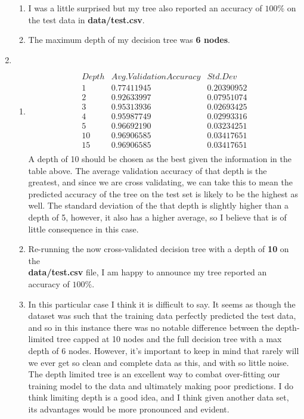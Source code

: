 \documentclass[11pt,a4paper,draft]{article}
\begin{document}
\begin{enumerate}
\begin{enumerate}
				 \item I was a little surprised but my tree also reported an accuracy of $100\%$ on the test data in \textbf{data/test.csv}.
				 
				 \item The maximum depth of my decision tree was \textbf{6 nodes}.
				
			\end{enumerate}
		
			\item $ $
			\begin{enumerate}
				\item $$
				\begin{array}{c|cc}
					Depth & Avg. Validation Accuracy & Std. Dev \\ \hline
					1  & 0.77411945  & 0.20390952   \\
					2  & 0.92633997  & 0.07951074   \\
					3  & 0.95313936  & 0.02693425   \\
					4  & 0.95987749  & 0.02993316   \\
					5  & 0.96692190  & 0.03234251   \\
					10 & 0.96906585  & 0.03417651   \\
					15 & 0.96906585  & 0.03417651   \\
				\end{array}
				$$ A depth of 10 should be chosen as the best given the information in the table above. The average validation accuracy of that depth is the greatest, and since we are cross validating, we can take this to mean the predicted accuracy of the tree on the test set is likely to be the highest as well. The standard deviation of the that depth is slightly higher than a depth of 5, however, it also has a higher average, so I believe that is of little consequence in this case.
				
				\item Re-running the now cross-validated decision tree with a depth of \textbf{10} on the \\\textbf{data/test.csv} file, I am happy to announce my tree reported an accuracy of $100\%$.
				
				\item In this particular case I think it is difficult to say. It seems as though the dataset was such that the training data perfectly predicted the test data, and so in this instance there was no notable difference between the depth-limited tree capped at 10 nodes and the full decision tree with a max depth of 6 nodes. However, it's important to keep in mind that rarely will we ever get so clean and complete data as this, and with so little noise. The depth limited tree is an excellent way to combat over-fitting our training model to the data and ultimately making poor predictions. I do think limiting depth is a good idea, and I think given another data set, its advantages would be more pronounced and evident.
			\end{enumerate}
		\end{enumerate}
	
\end{document}
